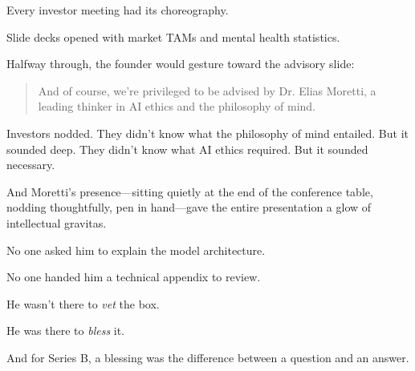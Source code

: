 Every investor meeting had its choreography.

Slide decks opened with market TAMs and mental health statistics.

Halfway through, the founder would gesture toward the advisory slide:

\begin{quote}
And of course, we’re privileged to be advised by Dr. Elias Moretti, a leading thinker in AI ethics 
and the philosophy of mind.
\end{quote}

Investors nodded. They didn’t know what the philosophy of mind entailed. But it sounded deep.  
They didn’t know what AI ethics required. But it sounded necessary.

And Moretti’s presence—sitting quietly at the end of the conference table, nodding thoughtfully, pen 
in hand—gave the entire presentation a glow of intellectual gravitas.

No one asked him to explain the model architecture.  

No one handed him a technical appendix to review.

He wasn’t there to \textit{vet} the box.

He was there to \textit{bless} it.

And for Series B, a blessing was the difference between a question and an answer.

